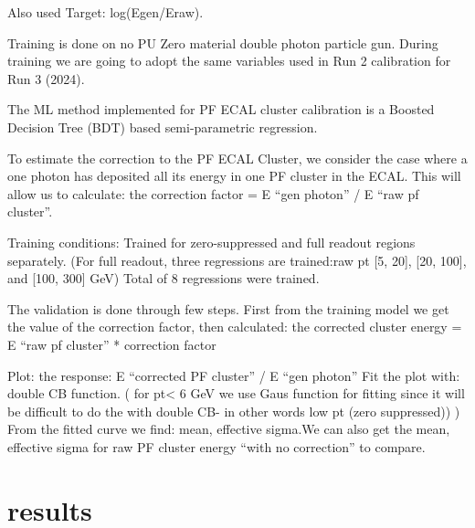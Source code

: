 Also  used Target: log(Egen/Eraw).

Training is done on no PU Zero material double photon particle gun. During training we are going to adopt the same variables used in Run 2 calibration for Run 3 (2024).

The ML method implemented for PF ECAL cluster calibration is a Boosted Decision Tree (BDT) based semi-parametric regression.

To estimate the correction to  the PF ECAL Cluster, we consider the case where a one photon has deposited all its energy in one PF cluster in the ECAL.
This will allow us to calculate: the correction factor = E “gen photon” / E “raw pf cluster”.


Training conditions:
Trained for zero-suppressed and full readout regions separately.
(For full readout, three regressions are trained:raw pt [5, 20], [20, 100], and [100, 300] GeV)
Total of 8 regressions were trained.

The validation is done through few steps.
First from the training model we get the value of the correction factor, then  calculated:  the corrected cluster energy = E “raw pf cluster” * correction factor

Plot: the response: E “corrected PF cluster” / E “gen photon”
Fit the plot with: double CB function. ( for pt< 6 GeV we use Gaus function for fitting since it will be difficult to do the with double CB- in other words low pt (zero suppressed)) ) 
From the fitted curve we find: mean, effective sigma.We can also get the mean, effective sigma for raw PF cluster energy “with no correction” to compare.

\section{results}


